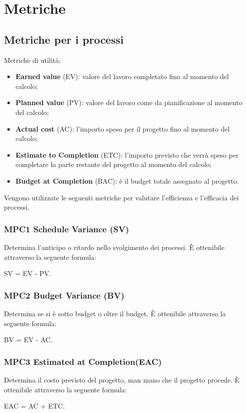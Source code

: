 \appendix
\section{Metriche}
  \subsection{Metriche per i processi}
  Metriche di utilità:
    \begin{itemize}
      \item \textbf{Earned value} (EV): valore del lavoro completato fino al momento del calcolo;
      \item \textbf{Planned value} (PV): valore del lavoro come da pianificazione al momento del calcolo;
      \item \textbf{Actual cost} (AC): l'importo speso per il progetto fino al momento del calcolo;
      \item \textbf{Estimate to Completion} (ETC): l'importo previsto che verrà speso per completare la parte restante del progetto al momento del calcolo;
      \item \textbf{Budget at Completion} (BAC): è il budget totale assegnato al progetto.
    \end{itemize}
  Vengono utilizzate le seguenti metriche per valutare l'efficienza e l'efficacia dei processi.
    \subsubsection{MPC1 Schedule Variance (SV)}
    Determina l'anticipo o ritardo nello svolgimento dei processi. È ottenibile attraverso la seguente formula:
      \begin{center}SV = EV - PV.\end{center}
    
    \subsubsection{MPC2 Budget Variance (BV)}
    Determina se si è sotto budget o oltre il budget. È ottenibile attraverso la seguente formula:
      \begin{center}BV = EV - AC.\end{center}

    \subsubsection{MPC3 Estimated at Completion(EAC)}
    Determina il costo previsto del progetto, man mano che il progetto procede. È ottenibile attraverso la seguente formula:
      \begin{center}EAC = AC + ETC.\end{center}
    
